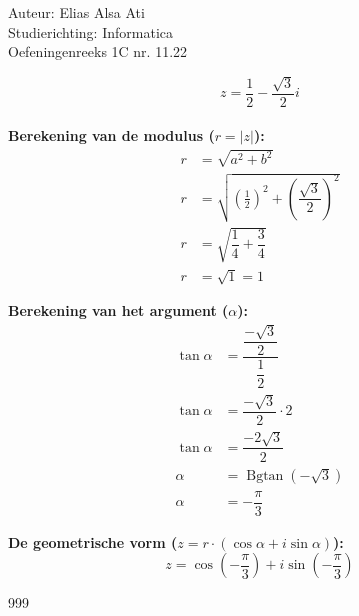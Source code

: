 \documentclass[a4paper]{article}
\begin{document}
\noindent \large Auteur: Elias Alsa Ati                         \\
\noindent \large Studierichting: Informatica                    \\
\noindent \large Oefeningenreeks 1C nr. 11.22 \small\cite{a}    \\

\medskip

\normalsize

$$z = \dfrac{1}{2} - \dfrac{\sqrt{3}}{2}i $$ \\

\textbf{ Berekening van de modulus ($r = |z|$): }
\begin{align*}
    r   &= \sqrt{a^2 + b^2}                                                             \\
    r   &= \sqrt{ \left(\frac{1}{2}\right)^2 + \left(\dfrac{\sqrt{3}}{2}\right)^2 }    \\
    r   &= \sqrt{\dfrac{1}{4} + \dfrac{3}{4}}                                           \\
    r   &= \sqrt{1} = 1
\end{align*}

\textbf{ Berekening van het argument ($\alpha$): }
\begin{align*}
    \tan \alpha &= \dfrac{  \dfrac{-\sqrt{3}}{2}}{\dfrac{1}{2}} \\
    \tan \alpha &= \dfrac{- \sqrt{3}}{2} \cdot 2                \\
    \tan \alpha &= \dfrac{-2 \sqrt{3}}{2}                       \\
    \alpha      &= \operatorname{Bgtan} \left(-\sqrt{3}\right)               \\
    \alpha      &= - \dfrac{\pi}{3}
\end{align*}

\textbf{ De geometrische vorm ($z = r \cdot (\cos \alpha + i \sin \alpha)$): }
$$ z = \cos \left(-\dfrac{\pi}{3}\right) + i \sin \left(-\dfrac{\pi}{3}\right)$$


\begin{thebibliography}{999}
\end{thebibliography}
\end{document}
